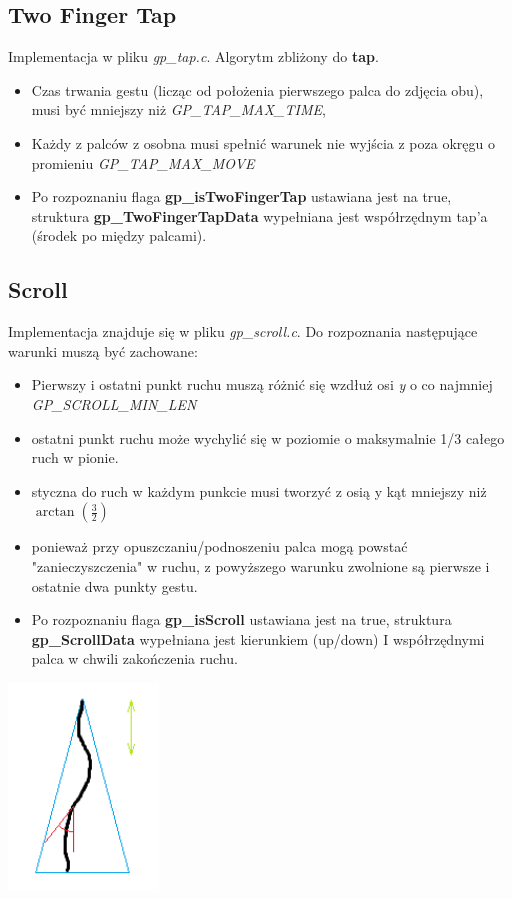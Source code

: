 \documentclass[a4paper,12pt]{article}
\begin{document}
	\subsection{Two Finger Tap}
	Implementacja w pliku \textit{gp_tap.c}. Algorytm zbliżony do \textbf{tap}. 
	\begin{itemize}
		\item Czas trwania gestu (licząc od położenia pierwszego palca do zdjęcia obu), musi być mniejszy niż \textit{GP_TAP_MAX_TIME},
		\item Każdy z palców z osobna musi spełnić warunek nie wyjścia z poza okręgu o promieniu \textit{GP_TAP_MAX_MOVE}
		\item Po rozpoznaniu flaga \textbf{gp_isTwoFingerTap} ustawiana jest na true, struktura \textbf{gp_TwoFingerTapData} wypełniana jest współrzędnym tap'a (środek po między palcami).
	\end{itemize}	
	
	\subsection{Scroll}
		Implementacja znajduje się w pliku \textit{gp_scroll.c}.
		Do rozpoznania następujące warunki muszą być zachowane:
		\begin{itemize}
			\item Pierwszy i ostatni punkt ruchu muszą różnić się wzdłuż osi \textit{y} o co najmniej \textit{GP_SCROLL_MIN_LEN}
			\item ostatni punkt ruchu może wychylić się w poziomie o maksymalnie 1/3 całego ruch w pionie.
			\item styczna do ruch w każdym punkcie musi tworzyć z osią y kąt mniejszy  niż $\arctan(\frac{3}{2}) $ 
			\item ponieważ przy opuszczaniu/podnoszeniu palca mogą powstać "zanieczyszczenia" w ruchu, z powyższego warunku zwolnione są  pierwsze i ostatnie dwa punkty gestu.
			\item Po rozpoznaniu flaga \textbf{gp_isScroll} ustawiana jest na true, struktura \textbf{gp_ScrollData} wypełniana jest kierunkiem (up/down) I współrzędnymi palca w chwili zakończenia ruchu.
		\end{itemize}
	\includegraphics[width=0.3\textwidth]{../data/ImplScroll}
	
\end{document}

